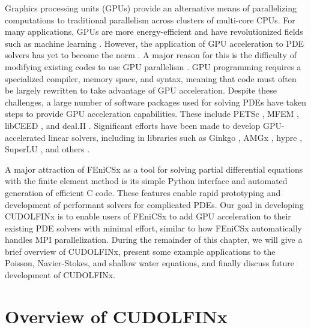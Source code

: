 Graphics processing units (GPUs) provide an alternative means of parallelizing computations to traditional parallelism across clusters of multi-core CPUs. For many applications, GPUs are more energy-efficient and have revolutionized fields such as machine learning \cite{navarro2014survey}. However, the application of GPU acceleration to PDE solvers has yet to become the norm \cite{fu2014architecting}. A major reason for this is the difficulty of modifying existing codes to use GPU parallelism \cite{MILLS2021102831}. GPU programming requires a specialized compiler, memory space, and syntax, meaning that code must often be largely rewritten to take advantage of GPU acceleration. Despite these challenges, a large number of software packages used for solving PDEs have taken steps to provide GPU acceleration capabilities. These include PETSc \cite{MILLS2021102831}, MFEM \cite{anderson2021mfem}, libCEED \cite{abdelfattah2021gpu}, and deal.II \cite{arndt2021deal}. Significant efforts have been made to develop GPU-accelerated linear solvers, including in libraries such as Ginkgo \cite{ginkgo-toms-2022}, AMGx \cite{naumov2015amgx}, hypre \cite{li2020efficient, falgout2021porting}, SuperLU \cite{li2023newly}, and others \cite{lu2023tilesptrsv}.

A major attraction of FEniCSx \cite{baratta2023dolfinx} as a tool for solving partial differential equations with the finite element method is its simple Python interface and automated generation of efficient C code. These features enable rapid prototyping and development of performant solvers for complicated PDEs. Our goal in developing CUDOLFINx is to enable users of FEniCSx to add GPU acceleration to their existing PDE solvers with minimal effort, similar to how FEniCSx automatically handles MPI parallelization. During the remainder of this chapter, we will give a brief overview of CUDOLFINx, present some example applications to the Poisson, Navier-Stokes, and shallow water equations, and finally discuss future development of CUDOLFINx. 

\section*{Overview of CUDOLFINx}

